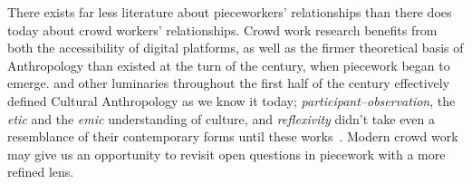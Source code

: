 \documentclass[trackingWork]{subfiles}
\begin{document}
There exists far less literature about pieceworkers' relationships than there does today about crowd workers' relationships.
Crowd work research benefits from both the accessibility of digital platforms, as well as the firmer theoretical basis of Anthropology than
existed at the turn of the  century, when piecework began to emerge.
\citeauthor{malinowski2002argonauts,boas1940race,mead1973coming} and
other luminaries throughout the first half of the  century
effectively defined Cultural Anthropology as we know it today;
\textit{participant--observation},
the \textit{etic} and the \textit{emic} understanding of culture, and
\textit{reflexivity}
didn't take even a resemblance of their contemporary forms until these works~\cite{malinowski2002argonauts,boas1940race,mead1973coming}.
Modern crowd work may give us an opportunity to revisit open questions in piecework with a more refined lens.











\end{document}
